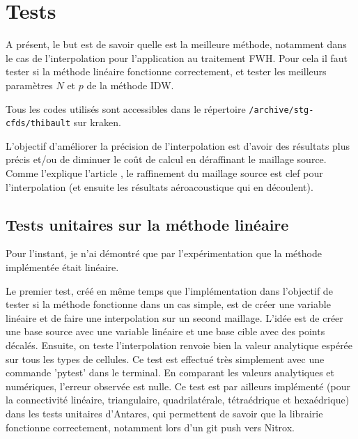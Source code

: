 

\section{Tests}
A présent, le but est de savoir quelle est la meilleure méthode, notamment dans le cas de l'interpolation pour l'application au traitement FWH. Pour cela il faut tester si la méthode linéaire fonctionne correctement, et tester les meilleurs paramètres \(N\) et \(p\) de la méthode IDW.

Tous les codes utilisés sont accessibles dans le répertoire \texttt{/archive/stg-cfds/thibault} sur kraken.

L'objectif d'améliorer la précision de l'interpolation est d'avoir des résultats plus précis et/ou de diminuer le coût de calcul en déraffinant le maillage source.
Comme l'explique l'article \cite{schoder2019}, le raffinement du maillage source est clef pour l'interpolation (et ensuite les résultats aéroacoustique qui en découlent).

\subsection{Tests unitaires sur la méthode linéaire}

Pour l'instant, je n'ai démontré que par l'expérimentation que la méthode implémentée était linéaire.

Le premier test, créé en même temps que l'implémentation dans l'objectif de tester si la méthode fonctionne dans un cas simple, est de créer une variable linéaire et de faire une interpolation sur un second maillage. L'idée est de créer une base source avec une variable linéaire et une base cible avec des points décalés. Ensuite, on teste l'interpolation renvoie bien la valeur analytique espérée sur tous les types de cellules. Ce test est effectué très simplement avec une commande 'pytest' dans le terminal. En comparant les valeurs analytiques et numériques, l'erreur observée est nulle. Ce test est par ailleurs implémenté (pour la connectivité linéaire, triangulaire, quadrilatérale, tétraédrique et hexaédrique) dans les tests unitaires d'Antares, qui permettent de savoir que la librairie fonctionne correctement, notamment lors d'un git push vers Nitrox.

